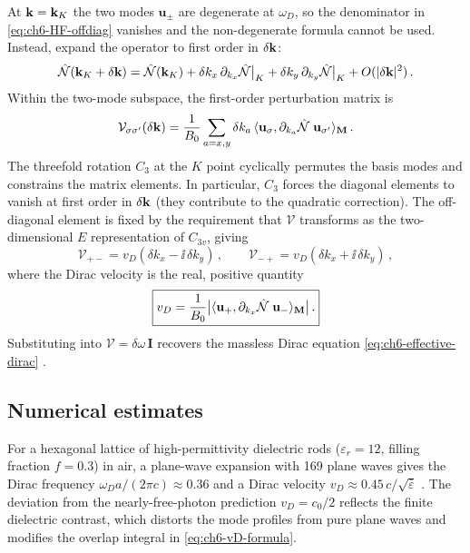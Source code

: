 At $\mathbf{k}=\mathbf{k}_K$ the two modes $\mathbf{u}_\pm$ are degenerate at
$\omega_D$, so the denominator in \eqref{eq:ch6-HF-offdiag} vanishes
and the non-degenerate formula cannot be used.  Instead, expand
the operator to first order in $\delta\mathbf{k}$:
\begin{equation}\label{eq:ch6-Maxop-expand}
  \hat{\mathcal{N}}(\mathbf{k}_K+\delta\mathbf{k})
  = \hat{\mathcal{N}}(\mathbf{k}_K)
  + \delta k_x\,\partial_{k_x}\hat{\mathcal{N}}\big|_K
  + \delta k_y\,\partial_{k_y}\hat{\mathcal{N}}\big|_K
  + O(|\delta\mathbf{k}|^2)\,.
\end{equation}
Within the two-mode subspace, the first-order perturbation matrix is
\begin{equation}\label{eq:ch6-V-matrix}
  \mathcal{V}_{\sigma\sigma'}(\delta\mathbf{k})
  = \frac{1}{B_0}
  \sum_{a=x,y}\delta k_a\,
  \langle \mathbf{u}_\sigma , \partial_{k_a}\hat{\mathcal{N}}\;\mathbf{u}_{\sigma'} \rangle_{\mathbf{M}}\,.
\end{equation}
The threefold rotation $C_3$ at the $K$ point cyclically permutes
the basis modes and constrains the matrix elements.
In particular, $C_3$ forces the diagonal elements to vanish at
first order in $\delta\mathbf{k}$ (they contribute to the quadratic
correction).  The off-diagonal element is fixed by the requirement
that $\mathcal{V}$ transforms as the two-dimensional $E$
representation of $C_{3v}$, giving
\begin{equation}\label{eq:ch6-V-offdiag}
  \mathcal{V}_{+-} = v_D(\delta k_x - \ii\,\delta k_y)\,,
  \qquad
  \mathcal{V}_{-+} = v_D(\delta k_x + \ii\,\delta k_y)\,,
\end{equation}
where the Dirac velocity is the real, positive quantity
\begin{equation}\label{eq:ch6-vD-formula}
  \boxed{%
  v_D = \frac{1}{B_0}
  \bigl|\emip{\mathbf{u}_+}{\partial_{k_x}\Maxop\;\mathbf{u}_-}\bigr|\,.}
\end{equation}
Substituting into $\mathcal{V}=\delta\omega\,\mathbf{I}$ recovers
the massless Dirac equation \eqref{eq:ch6-effective-dirac}
\cite{haldane2008reflection}.

\subsection{Numerical estimates}
\label{sec:ch6-numerical-vD}

For a hexagonal lattice of high-permittivity dielectric rods
($\varepsilon_r=12$, filling fraction $f=0.3$) in air, a plane-wave
expansion with 169 plane waves gives the Dirac frequency
$\omega_D a/(2\pi c)\approx 0.36$ and a Dirac velocity
$v_D\approx 0.45\,c/\sqrt{\bar\varepsilon}$
\cite{haldane2008possible,ozawa2018topological}.  The deviation from
the nearly-free-photon prediction $v_D=c_0/2$ reflects the finite
dielectric contrast, which distorts the mode profiles from pure
plane waves and modifies the overlap integral in
\eqref{eq:ch6-vD-formula}.

